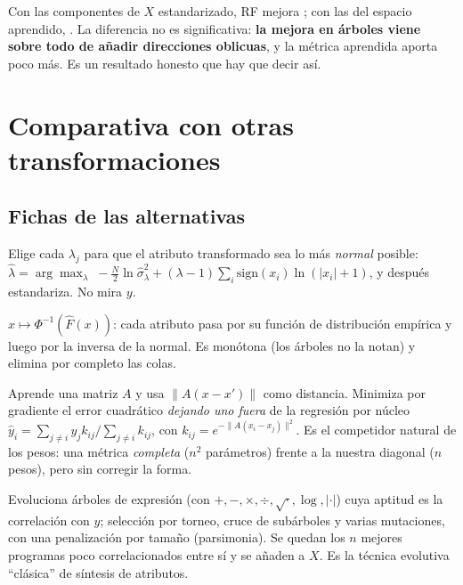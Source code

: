 \documentclass[apuntes]{uc3mmaster}
\begin{document}
\begin{idea}
Con las componentes de $X$ estandarizado, RF mejora \compEstPCARF; con las del espacio aprendido, \compPRF. La
diferencia no es significativa: \textbf{la mejora en árboles viene sobre todo de añadir direcciones oblicuas}, y la
métrica aprendida aporta poco más. Es un resultado honesto que hay que decir así.
\end{idea}

\section{Comparativa con otras transformaciones}\label{sec:comparativa}
\subsection{Fichas de las alternativas}
\begin{definicion}
Elige cada $\lambda_j$ para que el atributo transformado sea lo más \emph{normal} posible:
$\hat\lambda=\arg\max_\lambda\;-\tfrac N2\ln\hat\sigma^2_\lambda+(\lambda-1)\sum_i\mathrm{sign}(x_i)\ln(|x_i|+1)$,
y después estandariza. No mira $y$.
\end{definicion}
\begin{definicion}
$x\mapsto\Phi^{-1}(\hat F(x))$: cada atributo pasa por su función de distribución empírica y luego por la inversa de
la normal. Es monótona (los árboles no la notan) y elimina por completo las colas.
\end{definicion}
\begin{definicion}
Aprende una matriz $A$ y usa $\lVert A(x-x')\rVert$ como distancia. Minimiza por gradiente el error cuadrático
\emph{dejando uno fuera} de la regresión por núcleo
$\hat y_i=\sum_{j\ne i}y_jk_{ij}/\sum_{j\ne i}k_{ij}$, con $k_{ij}=e^{-\lVert A(x_i-x_j)\rVert^2}$. Es el
competidor natural de los pesos: una métrica \emph{completa} ($n^2$ parámetros) frente a la nuestra diagonal
($n$ pesos), pero sin corregir la forma.
\end{definicion}
\begin{definicion}
Evoluciona árboles de expresión (con $+,-,\times,\div,\sqrt{\cdot},\log,|\cdot|$) cuya aptitud es la correlación con
$y$; selección por torneo, cruce de subárboles y varias mutaciones, con una penalización por tamaño (parsimonia).
Se quedan los $n$ mejores programas poco correlacionados entre sí y se añaden a $X$. Es la técnica evolutiva
``clásica'' de síntesis de atributos.
\end{definicion}
\end{document}
